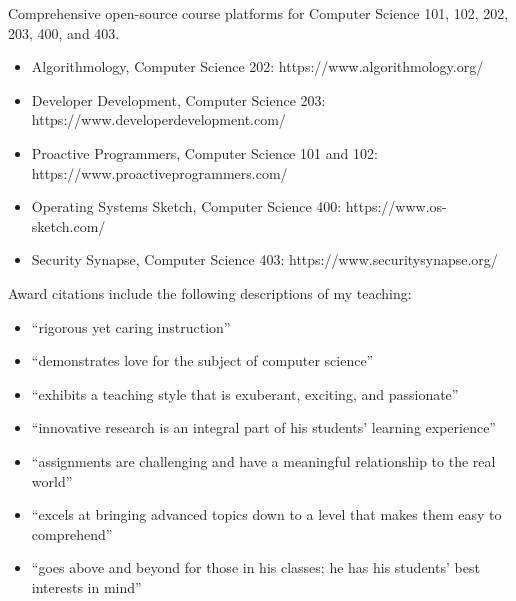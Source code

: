 \documentclass[11pt,letterpaper,sans]{moderncv}
\begin{document}
{Comprehensive open-source course platforms for Computer Science 101, 102, 202,
  203, 400, and 403.~\vspace*{.025in}
  \begin{itemize}
    \renewcommand\labelitemi{\Large\textbullet}
    \item Algorithmology, Computer Science 202: https://www.algorithmology.org/
    \item Developer Development, Computer Science 203: https://www.developerdevelopment.com/
    \item Proactive Programmers, Computer Science 101 and 102: https://www.proactiveprogrammers.com/
    \item Operating Systems Sketch, Computer Science 400: https://www.os-sketch.com/
    \item Security Synapse, Computer Science 403: https://www.securitysynapse.org/
  \end{itemize}
  \vspace*{.05in}
}



{Award citations include the following descriptions of my teaching: \vspace*{.025in}
  \begin{itemize}
    \renewcommand\labelitemi{\Large\textbullet}
    \item ``rigorous yet caring instruction''
    \item ``demonstrates love for the subject of computer science''
    \item ``exhibits a teaching style that is exuberant, exciting, and passionate''
    \item ``innovative research is an integral part of his students’ learning experience''
    \item ``assignments are challenging and have a meaningful relationship to the real world''
    \item ``excels at bringing advanced topics down to a level that makes them easy to comprehend''
    \item ``goes above and beyond for those in his classes; he has his students’ best interests in mind''
  \end{itemize}}
\end{document}
